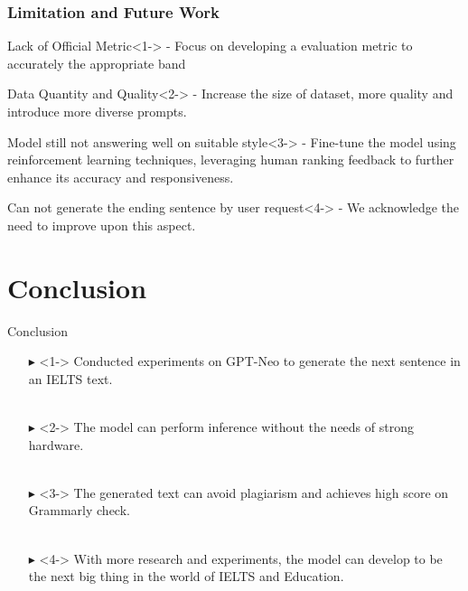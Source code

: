 \documentclass[10pt]{beamer}
\begin{document}
\begin{frame}
\frametitle{Limitation and Future Work}
\begin{block}{Lack of Official Metric}<1->
- Focus on developing a evaluation metric to accurately the appropriate band
\end{block}

\begin{block}{Data Quantity and Quality}<2->
- Increase the size of dataset, more quality and introduce more diverse prompts.
\end{block}

\begin{block}{Model still not answering well on suitable style}<3->
- Fine-tune the model using reinforcement learning techniques, leveraging human ranking feedback to further enhance its accuracy and responsiveness.\\
\end{block}

\begin{block}{Can not generate the ending sentence by user request}<4->
- We acknowledge the need to improve upon this aspect.
\end{block}
\end{frame}

\section{Conclusion}
\begin{frame}{Conclusion}
 \begin{itemize}
    \item[$\blacktriangleright$]<1-> Conducted experiments on GPT-Neo to generate the next sentence in an IELTS text. \\~\\
    \item[$\blacktriangleright$]<2-> The model can perform inference without the needs of strong hardware.\\~\\
    \item[$\blacktriangleright$]<3-> The generated text can avoid plagiarism and achieves high score on Grammarly check.\\~\\
    \item[$\blacktriangleright$]<4-> With more research and experiments, the model can develop to be the next big thing in the world of IELTS and Education.
\end{itemize}   
\end{frame}
\end{document}
